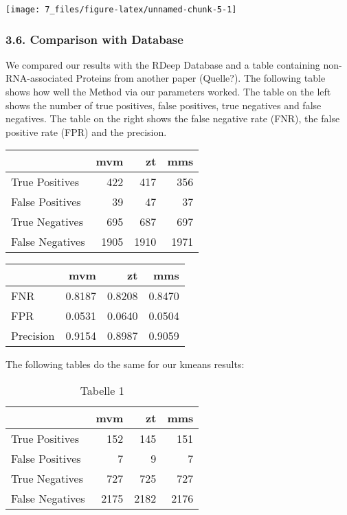 \documentclass[
  12pt,
]{article}
\begin{document}
\texttt{[image: 7\_files/figure-latex/unnamed-chunk-5-1]}

\hypertarget{comparison-with-database}{%
\subsubsection{3.6. Comparison with
Database}\label{comparison-with-database}}

We compared our results with the RDeep Database and a table containing
non-RNA-associated Proteins from another paper (Quelle?). The following
table shows how well the Method via our parameters worked. The table on
the left shows the number of true positives, false positives, true
negatives and false negatives. The table on the right shows the false
negative rate (FNR), the false positive rate (FPR) and the precision.

\begin{table}
\centering
\begin{tabular}{l|r|r|r}
\hline
  & mvm & zt & mms\\
\hline
True Positives & 422 & 417 & 356\\
\hline
False Positives & 39 & 47 & 37\\
\hline
True Negatives & 695 & 687 & 697\\
\hline
False Negatives & 1905 & 1910 & 1971\\
\hline
\end{tabular}
\end{table}

\begin{table}
\centering
\begin{tabular}{l|r|r|r}
\hline
  & mvm & zt & mms\\
\hline
FNR & 0.8187 & 0.8208 & 0.8470\\
\hline
FPR & 0.0531 & 0.0640 & 0.0504\\
\hline
Precision & 0.9154 & 0.8987 & 0.9059\\
\hline
\end{tabular}
\end{table}

The following tables do the same for our kmeans results:

\begin{table}

\caption{\label{tab:unnamed-chunk-7}Tabelle 1}
\centering
\begin{tabular}[t]{l|r|r|r}
\hline
  & mvm & zt & mms\\
\hline
True Positives & 152 & 145 & 151\\
\hline
False Positives & 7 & 9 & 7\\
\hline
True Negatives & 727 & 725 & 727\\
\hline
False Negatives & 2175 & 2182 & 2176\\
\hline
\end{tabular}
\end{table}
\end{document}
